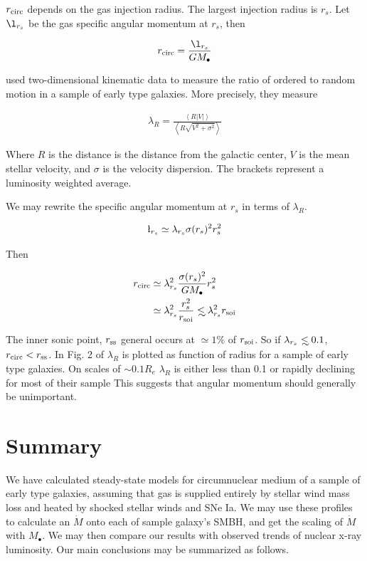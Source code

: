 \documentclass[usenatbib,fleqn]{mn2e}
\newcommand{\Mdot}{\dot{M}}
\newcommand\lsim{\mathrel{\rlap{\lower4pt\hbox{\hskip1pt$\sim$}}
    \raise1pt\hbox{$<$}}}
\newcommand{\rs}{r_s}
\newcommand{\rcirc}{r_{\rm circ}}
\newcommand{\rss}{r_{\rm ss}}
\newcommand{\lrs}{\l_{\rs}}
\newcommand{\lambdars}{\lambda_{\rs}}
\newcommand{\Mbh}[1][]{M_{\bullet#1}}
\newcommand{\soi}{\rm soi}
\newcommand{\rsoi}{r_{\soi}}
\begin{document}
  $\rcirc$ depends on the gas injection radius. The largest
  injection radius is $\rs$. Let $\lrs$ be the gas specific angular
  momentum at $\rs$, then 

  \begin{align}
    \rcirc=\frac{\lrs}{G \Mbh}
  \end{align}

  \citet{EmsellemCappellari+:2007a} used two-dimensional kinematic
  data to measure the ratio of ordered to random motion in a sample of
  early type galaxies. More precisely, they measure

  \begin{align}
    \lambda_R=\frac{\left<R|V|\right>}{\left<R\sqrt{V^2+\sigma^2}\right>}
  \end{align}

  Where $R$ is the distance is the distance from the galactic center, $V$ is
  the mean stellar velocity, and $\sigma$ is the velocity
  dispersion. The brackets represent a luminosity weighted average.

  We may rewrite the specific angular momentum at $\rs$ in terms of $\lambda_R$.

  \begin{align}
    \lrs\simeq\lambdars \sigma(\rs)^2 \rs^2
  \end{align}

  Then

  \begin{align}
    \rcirc&\simeq\lambdars^2 \frac{\sigma(\rs)^2}{G \Mbh} \rs^2\\
    &\simeq\lambdars^2 \frac{\rs^2}{\rsoi} \lsim \lambdars^2 \rsoi
  \end{align}

  The inner sonic point, $\rss$ general occurs at $\simeq 1\%$ of
  $\rsoi$. %
  So if $\lambdars\lsim 0.1$, $\rcirc<\rss$. In Fig. 2 of
  \citet{EmsellemCappellari+:2007a} $\lambda_R$ is plotted as function
  of radius for a sample of early type galaxies. On scales of $\sim 0.1
  R_e$ $\lambda_R$ is either less than 0.1 or rapidly declining for most
  of their sample %
  This suggests that angular momentum should generally be unimportant.

  \section{Summary}
  \label{sec:summary}
  We have calculated steady-state models for circumnuclear medium of a
  sample of early type galaxies, assuming that gas is supplied
  entirely by stellar wind mass loss and heated by shocked stellar
  winds and SNe Ia. We may use these profiles to calculate an $\Mdot$
  onto each of sample galaxy's SMBH, and get the scaling of $\Mdot$
  with $\Mbh$. We may then compare our results with observed trends of
  nuclear x-ray luminosity. Our main conclusions may be summarized as
  follows.
\end{document}
